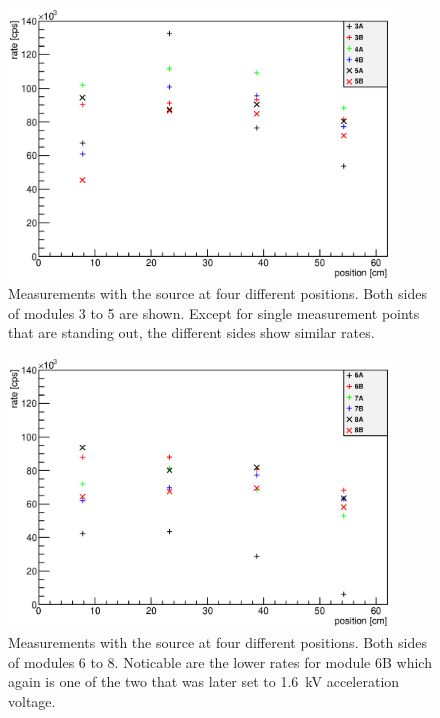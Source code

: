     \begin{figure}
		\centering
		\includegraphics[width = 0.9\textwidth]{graphics/analysis/345final.eps}
  	\caption[Testing of muon modules with Sr source - Modules 3 - 5]{Measurements with the source at four different positions. Both sides of modules 3 to 5 are shown. Except for single measurement points that are standing out, the different sides show similar rates. }
  	\label{fig:SrRatesPMT345}
  \end{figure}
    \begin{figure}
		\centering
		\includegraphics[width = 0.9\textwidth]{graphics/analysis/678final.eps}
  	\caption[Testing of muon modules with Sr source - Modules 6 - 8]{Measurements with the source at four different positions. Both sides of modules 6 to 8. Noticable are the lower rates for module 6B which again is one of the two that was later set to \SI{1.6}{\kilo\volt} acceleration voltage. }
  	\label{fig:SrRatesPMT678}
  \end{figure}

